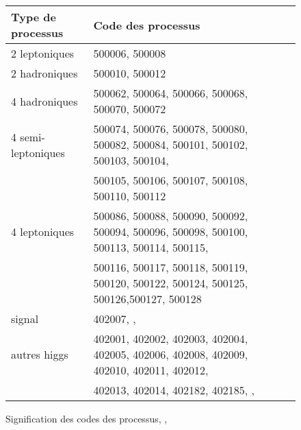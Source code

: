 
\begin{figure}[h!]
    \centering
    \begin{tabular}{ | l | l | l | }
    		\hline
    		Type de processus & Code des processus \\
        \hline
        2 leptoniques & 500006, 500008 \\
        \hline
        2 hadroniques & 500010, 500012 \\
        \hline
        4 hadroniques & 500062, 500064, 500066, 500068, 500070, 500072 \\
        \hline
        4 semi-leptoniques & 500074, 500076, 500078, 500080, 500082, 500084, 500101, 500102, 500103, 500104, \\ 
        & 500105, 500106, 500107, 500108, 500110, 500112 \\
        \hline
        4 leptoniques & 500086, 500088, 500090, 500092, 500094, 500096, 500098, 500100, 500113, 500114, 500115, \\
        & 500116, 500117, 500118, 500119, 500120, 500122, 500124, 500125, 500126,500127, 500128  \\
        	\hline
        signal & 402007, \color{red}{402173}, \color{blue}{402176}\\
        \hline
        autres higgs & 402001, 402002, 402003, 402004, 402005, 402006, 402008, 402009, 402010, 402011, 402012, \\ 
        & 402013, 402014, 402182, 402185, \color{blue}{402173}, \color{red}{402176}\\
        \hline
    \end{tabular}
    \caption{Signification des codes des processus, \color{red}{si le signal recherché est de type \bb}, \color{blue}{si le signal est \WW}}
    \label{data:code}
\end{figure}

